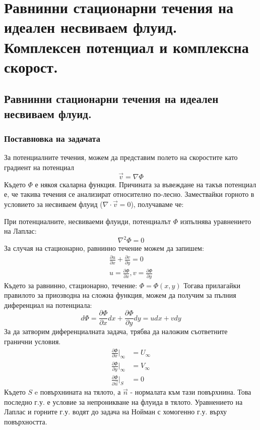 \section{Равнинни стационарни течения на идеален несвиваем флуид. Комплексен потенциал и комплексна скорост.}
\subsection{Равнинни стационарни течения на идеален несвиваем флуид.}
\subsubsection{Поставновка на задачата}
За потенциалните течения, можем да представим полето на скоростите като градиент на потенциал
\begin{equation*}
	\vec{v} = \nabla \Phi
\end{equation*}
Където $\Phi$ е някоя скаларна функция. Причината за въвеждане на такъв потенциал е, че такива течения се анализират относително по-лесно. Замествайки горното в условието за несвиваем флуид ($\nabla \cdot \vec{v} = 0$), получаваме че:

\noindent При потенциалните, несвиваеми флуиди, потенциалът $\Phi$ изпълнява уравнението на Лаплас:
\begin{equation*}
	\nabla^2 \Phi  = 0
\end{equation*}
За случая на стационарно, равнинно течение можем да запишем:
\begin{align}
	\label{eq:planar_flow}
	\frac{\partial u}{\partial x} + \frac{\partial v}{\partial y} = 0 \\
	u = \frac{\partial \Phi}{\partial x}, v = \frac{\partial \Phi}{\partial y}
\end{align}
Където за равнинно, стационарно, течение: $\Phi = \Phi(x,y)$
Тогава прилагайки правилото за приозводна на сложна функция, можем да получим за пълния диференциал на потенциала:
\begin{equation*}
	d \Phi = \frac{\partial \Phi}{\partial x} d x +  \frac{\partial \Phi}{\partial y} dy = u dx + v dy
\end{equation*}
За да затворим диференциалната задача, трябва да наложим съответните гранични условия.
\begin{align*}
	\frac{\partial \Phi}{\partial x} \Bigg|_{\infty}  & = U_{\infty} \\
	\frac{\partial \Phi}{\partial y} \Bigg|_{\infty}  & = V_{\infty} \\
	\frac{\partial \Phi}{\partial \vec{n}} \Bigg|_{S} & = 0
\end{align*}
Където $S$ e повърхнината на тялото, а $\vec{n}$ - нормалата към тази повърхнина. Това последно г.у. е условие за непроникване на
флуида в тялото.
Уравнението на Лаплас и горните г.у. водят до задача на Нойман с хомогенно г.у. върху повърхността.
